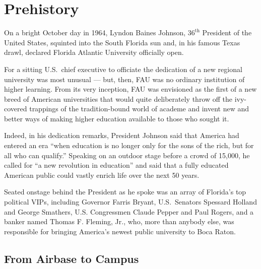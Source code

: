 \documentclass{article}
\begin{document}


\nolistoftables					%






\chapter{Prehistory}

On a bright October day in 1964, Lyndon Baines Johnson, $36^{\mathrm{th}}$ President of the United States, squinted into the South Florida sun and, in his famous Texas drawl, declared Florida Atlantic University officially open.

For a sitting U.S.\ chief executive to officiate the dedication of a new regional university was most unusual  ---  but, then, FAU was no ordinary institution of higher learning.  From its very inception, FAU was envisioned as the first of a new breed of American universities that would quite deliberately throw off the ivy-covered trappings of the tradition-bound world of academe and invent new and better ways of making higher education available to those who sought it.

Indeed, in his dedication remarks, President Johnson said that America had entered an era ``when education is no longer only for the sons of the rich, but for all who can qualify.''  Speaking on an outdoor stage before a crowd of 15,000, he called for ``a new revolution in education'' and said that a fully educated American public could vastly enrich life over the next 50 years.

Seated onstage behind the President as he spoke was an array of Florida's top political VIPs, including Governor Farris Bryant, U.S.\ Senators Spessard Holland and George Smathers, U.S. Congressmen Claude Pepper and Paul Rogers, and a banker named Thomas F. Fleming, Jr., who, more than anybody else, was responsible for bringing America's newest public university to Boca Raton.

\section{From Airbase to Campus}
\end{document}
